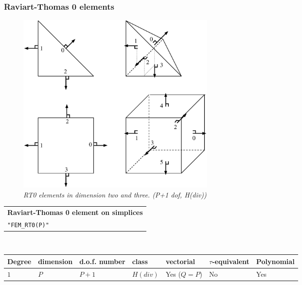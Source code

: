 \documentclass[10pt,a4paper]{article}
\begin{document}
\subsubsection{Raviart-Thomas 0 elements}

\begin{figure}[H]
  \begin{center}
    \includegraphics[width=10cm,angle=0]{getfemlist_RT0.eps}
  \end{center}
  \caption{ \it RT0 elements in dimension two and three. (P+1 dof, H(div))} 
  \label{fig:triangle_comp}
\end{figure}



\begin{center}
\begin{tabular}{|m{16.11cm}|} \hline 
{\bf Raviart-Thomas 0 element on simplices}\\
{\tt "FEM\_RT0(P)"}
\end{tabular} \\ \vspace{-1pt} 
\begin{tabular}{|m{2cm}|m{2cm}|m{2.5cm}|m{1.2cm}|m{2cm}|m{2cm}|m{1.8cm}|} \hline 
Degree & dimension & d.o.f. number & class & vectorial & \mbox{$\tau$-equivalent} & Polynomial\\ \hline
$1$ & $P$ & $P+1$ & $H(div)$ & Yes \mbox{($Q = P$)} & No & Yes\\ \hline
\end{tabular}
\end{center}
\end{document}
